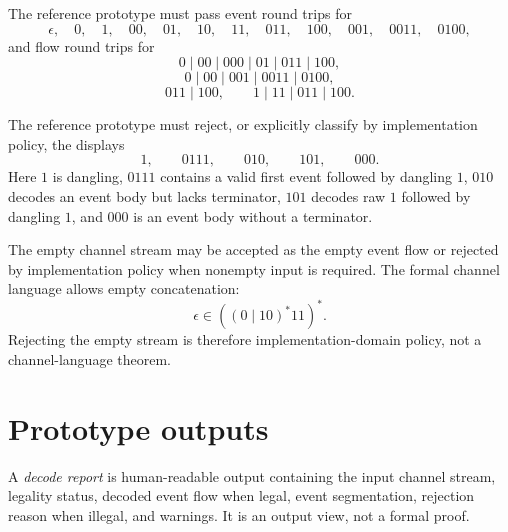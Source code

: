 \begin{definition}
\label{def:minimal-prototype-required-roundtrip-tests}
The reference prototype must pass event round trips for
$$
  \epsilon,\quad
  0,\quad
  1,\quad
  00,\quad
  01,\quad
  10,\quad
  11,\quad
  011,\quad
  100,\quad
  001,\quad
  0011,\quad
  0100,
$$
and flow round trips for
$$
  0\mid 00\mid 000\mid 01\mid 011\mid 100,
$$
$$
  0\mid 00\mid 001\mid 0011\mid 0100,
$$
$$
  011\mid 100,
  \qquad
  1\mid 11\mid 011\mid 100.
$$
\end{definition}

\begin{definition}
\label{def:minimal-prototype-required-reject-tests}
The reference prototype must reject, or explicitly classify by implementation policy, the displays
$$
  1,\qquad
  0111,\qquad
  010,\qquad
  101,\qquad
  000.
$$
Here $1$ is dangling, $0111$ contains a valid first event followed by dangling $1$, $010$ decodes an event body but lacks terminator, $101$ decodes raw $1$ followed by dangling $1$, and $000$ is an event body without a terminator.
\end{definition}

\begin{remark}
\label{rem:minimal-prototype-empty-stream-policy}
The empty channel stream may be accepted as the empty event flow or rejected by implementation policy when nonempty input is required. The formal channel language allows empty concatenation:
$$
  \epsilon\in((0\mid 10)^{\ast}11)^{\ast}.
$$
Rejecting the empty stream is therefore implementation-domain policy, not a channel-language theorem.
\end{remark}

\section{Prototype outputs}
\label{sec:minimal-prototype-outputs}

\begin{definition}
\label{def:minimal-prototype-decode-report}
A \emph{decode report} is human-readable output containing the input channel stream, legality status, decoded event flow when legal, event segmentation, rejection reason when illegal, and warnings. It is an output view, not a formal proof.
\end{definition}

